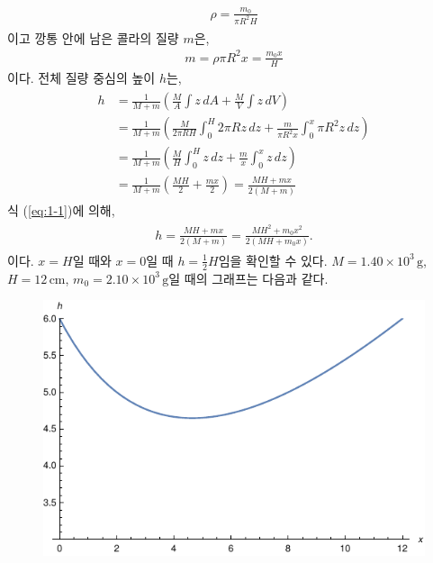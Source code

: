 \documentclass[floatfix,nofootinbib,superscriptaddress,fleqn]{revtex4-2}
\begin{document}
\begin{itemize}
\begin{align}
    \begin{split}
      \rho = \frac{m_0}{\pi R^2 H}
    \end{split}
  \end{align}
  이고 깡통 안에 남은 콜라의 질량 $m$은,
  \begin{align}\label{eq:1-1}
    m= \rho\pi R^2 x = \frac{m_0x}{H}
  \end{align}
  이다.
  전체 질량 중심의 높이 $h$는,
  \begin{align}
    \begin{split}
      h &= \frac{1}{M+m}\left(\frac{M}{A}\int z\,dA
      +\frac{M}{V}\int z\,dV\right) \\
      &= \frac{1}{M+m}\left(\frac{M}{2\pi R H}\int_0^H 2\pi R z\,dz
      +\frac{m}{\pi R^2 x}\int_0^x\pi R^2 z\,dz\right)  \\
      &= \frac{1}{M+m}\left(\frac{M}{H}\int_0^H z\,dz
      +\frac{m}{x}\int_0^x z\,dz\right) \\
      &= \frac{1}{M+m}\left(\frac{MH}{2}
      +\frac{mx}{2}\right) = \frac{MH+mx}{2(M+m)}
    \end{split}
  \end{align}
  식 (\ref{eq:1-1})에 의해,
  \begin{align}\label{eq:1-2}
    \begin{split}
      h = \frac{MH+mx}{2(M+m)}=\frac{MH^2+m_0x^2}{2(MH+m_0x)}.
    \end{split}
  \end{align}
  이다. $x=H$일 때와 $x=0$일 때 $h=\frac{1}{2}H$임을 확인할 수 있다.
  $M=1.40\times 10^{3}\,\mathrm{g}$, $H=12\,\mathrm{cm}$,
  $m_0=2.10\times 10^3\,\mathrm{g}$일 때의 그래프는 다음과 같다.
  \begin{figure}[htbp]
    \centering
    \includegraphics{.pdf}

\end{figure}
\end{itemize}
\end{document}
